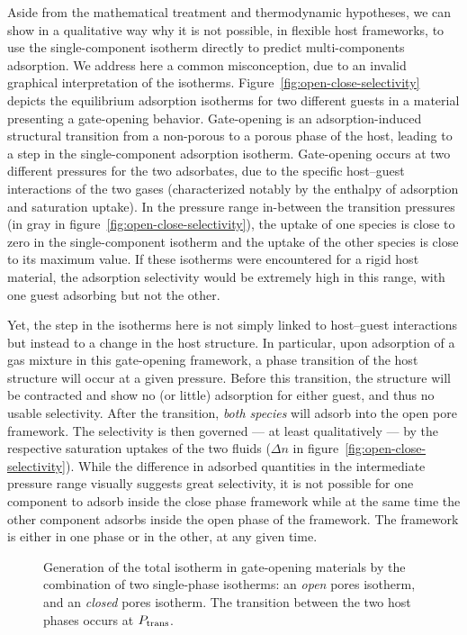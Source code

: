 \documentclass[thesis]{subfiles}
\begin{document}
Aside from the mathematical treatment and thermodynamic hypotheses, we can show
in a qualitative way why it is not possible, in flexible host frameworks, to use
the single-component isotherm directly to predict multi-components adsorption.
We address here a common misconception, due to an invalid graphical
interpretation of the isotherms. Figure~\ref{fig:open-close-selectivity} depicts
the equilibrium adsorption isotherms for two different guests in a material
presenting a gate-opening behavior. Gate-opening is an adsorption-induced
structural transition from a non-porous to a porous phase of the host, leading
to a step in the single-component adsorption isotherm. Gate-opening occurs at
two different pressures for the two adsorbates, due to the specific host--guest
interactions of the two gases (characterized notably by the enthalpy of
adsorption and saturation uptake). In the pressure range in-between the
transition pressures (in gray in figure~\ref{fig:open-close-selectivity}), the
uptake of one species is close to zero in the single-component isotherm and the
uptake of the other species is close to its maximum value. If these isotherms
were encountered for a rigid host material, the adsorption selectivity would be
extremely high in this range, with one guest adsorbing but not the other.

Yet, the step in the isotherms here is not simply linked to host--guest
interactions but instead to a change in the host structure. In particular, upon
adsorption of a gas mixture in this gate-opening framework, a phase transition
of the host structure will occur at a given pressure. Before this transition,
the structure will be contracted and show no (or little) adsorption for either
guest, and thus no usable selectivity. After the transition, \emph{both species}
will adsorb into the open pore framework. The selectivity is then governed ---
at least qualitatively --- by the respective saturation uptakes of the two
fluids ($\Delta n$ in figure~\ref{fig:open-close-selectivity}). While the
difference in adsorbed quantities in the intermediate pressure range visually
suggests great selectivity, it is not possible for one component to adsorb
inside the close phase framework while at the same time the other component
adsorbs inside the open phase of the framework. The framework is either in one
phase or in the other, at any given time.

\begin{figure}[htp]
    \centering
    
    \caption{Generation of the total isotherm in gate-opening materials by the
    combination of two single-phase isotherms: an \emph{open} pores isotherm,
    and an \emph{closed} pores isotherm. The transition between the two host
    phases occurs at $P_\text{\rmfamily trans}$.}
    \label{fig:open-close-isotherms}
\end{figure}
\end{document}
